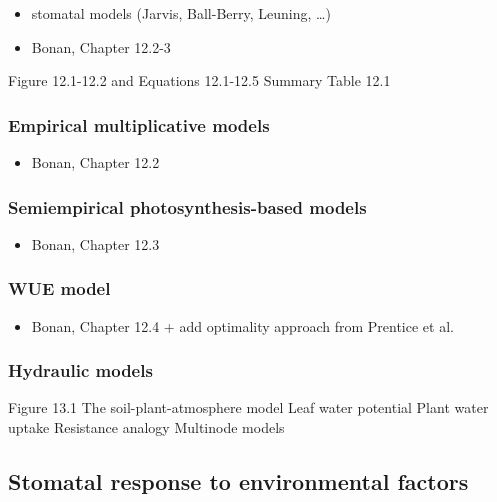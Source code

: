 \documentclass[oneside]{book}
\providecommand{\tightlist}{%
  \setlength{\itemsep}{0pt}\setlength{\parskip}{0pt}}
\begin{document}
\begin{itemize}
\tightlist
\item
  stomatal models (Jarvis, Ball-Berry, Leuning, \ldots{})
\item
  Bonan, Chapter 12.2-3
\end{itemize}

Figure 12.1-12.2 and Equations 12.1-12.5 Summary Table 12.1

\subsubsection{Empirical multiplicative
models}\label{empirical-multiplicative-models}

\begin{itemize}
\tightlist
\item
  Bonan, Chapter 12.2
\end{itemize}

\subsubsection{Semiempirical photosynthesis-based
models}\label{semiempirical-photosynthesis-based-models}

\begin{itemize}
\tightlist
\item
  Bonan, Chapter 12.3
\end{itemize}

\subsubsection{WUE model}\label{wue-model}

\begin{itemize}
\tightlist
\item
  Bonan, Chapter 12.4 + add optimality approach from Prentice et al.
\end{itemize}

\subsubsection{Hydraulic models}\label{hydraulic-models}

Figure 13.1 The soil-plant-atmosphere model Leaf water potential Plant
water uptake Resistance analogy Multinode models

\subsection{Stomatal response to environmental
factors}\label{stomatal-response-to-environmental-factors}
\end{document}
